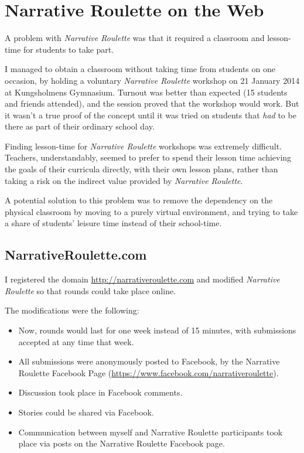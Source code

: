 \section{Narrative Roulette on the Web}

A problem with \emph{Narrative Roulette} was that it required a
classroom and lesson-time for students to take part.

I managed to obtain a classroom without taking time from students on one
occasion, by holding a voluntary \emph{Narrative Roulette} workshop on
21 January 2014 at Kungsholmens Gymnasium. Turnout was better than
expected (15 students and friends attended), and the session proved that
the workshop would work. But it wasn't a true proof of the concept until
it was tried on students that \emph{had} to be there as part of their
ordinary school day.

Finding lesson-time for \emph{Narrative Roulette} workshops was
extremely difficult. Teachers, understandably, seemed to prefer to spend
their lesson time achieving the goals of their curricula directly, with
their own lesson plans, rather than taking a risk on the indirect value
provided by \emph{Narrative Roulette}.

A potential solution to this problem was to remove the dependency on the
physical classroom by moving to a purely virtual environment, and trying to take a share of students' leisure time instead of their school-time.

\subsection{NarrativeRoulette.com}

I registered the domain \url{http://narrativeroulette.com} and modified
\emph{Narrative Roulette} so that rounds could take place online.

The modifications were the following: 

\begin{itemize}

\item Now, rounds would last for one
week instead of 15 minutes, with submissions accepted at any time that
week.

\item All submissions were anonymously posted to Facebook, by the
Narrative Roulette Facebook Page (\href{https://www.facebook.com/narrativeroulette}{https://www.facebook.com/narrativeroulette}).

\item Discussion took place in Facebook comments. 

\item Stories could be shared via Facebook. 

\item Communication between myself and Narrative Roulette participants took place via posts on the Narrative Roulette Facebook page.

\end{itemize}

